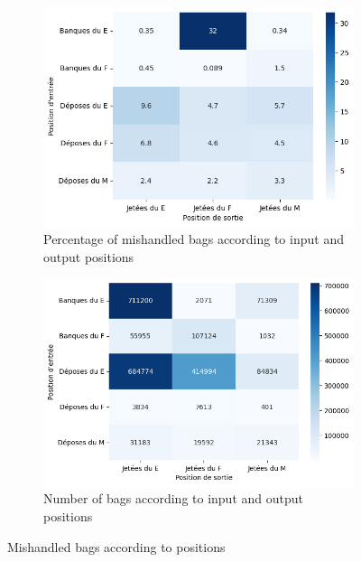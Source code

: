 \documentclass[12pt]{article}
\begin{document}
\FloatBarrier
\begin{figure}[ht]
  \centering
  \begin{subfigure}{0.45\textwidth}
    \includegraphics[width=\linewidth]{percentage of failed per positions.png}
    \caption{Percentage of mishandled bags according to input and output positions}
    \label{fig:Percentage of mishandled bags according to input and output positions}
  \end{subfigure}
  \hfill
  \begin{subfigure}{0.48\textwidth}
    \includegraphics[width=\linewidth]{number of bags per positions.png}
    \caption{Number of bags according to input and output positions}
    \label{fig:Number of bags according to input and output positions}
  \end{subfigure}
  \caption{Mishandled bags according to positions}
  \label{fig:Mishandled bags according to positions}
\end{figure}
\end{document}
